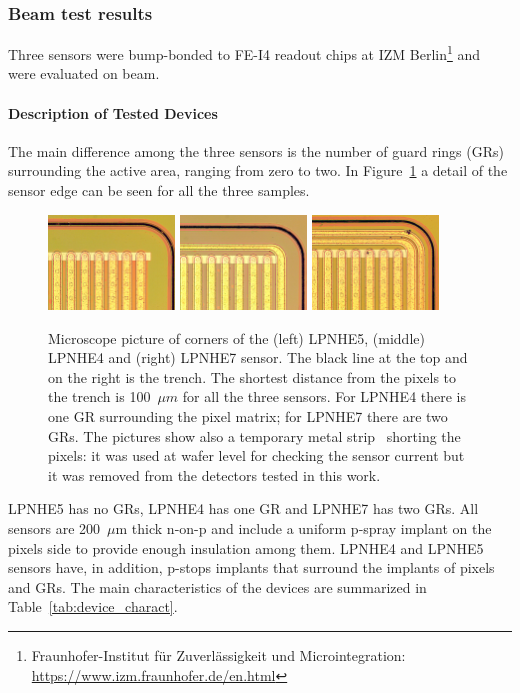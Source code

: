 \subsubsection{Beam test results}
Three sensors were bump-bonded to FE-I4 readout chips at IZM Berlin\footnote{Fraunhofer-Institut f\"ur Zuverl\"assigkeit und Microintegration: \url{https://www.izm.fraunhofer.de/en.html}} and were evaluated on beam.

\paragraph{Description of Tested Devices}
The main difference among the three sensors is  the number of guard rings (GRs) surrounding the active area, ranging from zero to two. In Figure~\ref{fig:lpnhe5_4_7_pic} a detail of the
sensor edge can be seen for all the three samples.

\begin{figure}[!htb]
\centering
\includegraphics[width=0.30\textwidth]{fei4_100um_0GRs.jpeg}
\includegraphics[width=0.30\textwidth]{fei4_100um_1GRs.jpeg}
\includegraphics[width=0.30\textwidth]{fei4_100um_2GRs.jpeg}
\caption{\label{fig:lpnhe5_4_7_pic}Microscope picture of corners of the  (left) LPNHE5, (middle) LPNHE4  and (right) LPNHE7 sensor. The black line at the top and on the right is the trench. The  shortest distance from the pixels to the trench is 100~$\mu m$ for all the three sensors. For LPNHE4 there is  one GR surrounding the pixel matrix; for LPNHE7 there are two GRs. The pictures show also a temporary metal strip~\cite{bib:metal} shorting the pixels: it was used at wafer level for checking the sensor current  but it was removed from the detectors tested in this work.}
\end{figure}
LPNHE5 has no GRs, LPNHE4 has one GR and LPNHE7 has two GRs. All sensors are 200~$\mu$m thick n-on-p and include a uniform p-spray implant on the pixels side to provide enough insulation among them. LPNHE4 and LPNHE5 sensors have, in addition, p-stops implants that surround the implants of pixels and GRs.
The main  characteristics of the devices are summarized in Table~\ref{tab:device_charact}.

